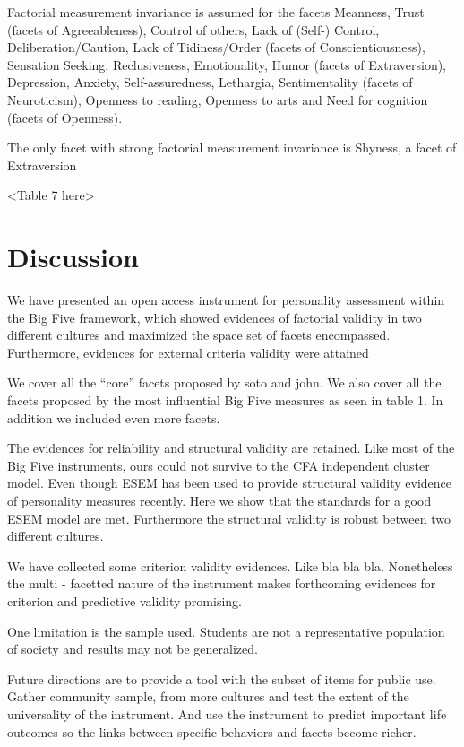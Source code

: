 \documentclass[man]{apa6}
\theoremstyle{definition}
\theoremstyle{definition}
\theoremstyle{definition}
\theoremstyle{remark}
\begin{document}
Factorial measurement invariance is assumed for the facets Meanness,
Trust (facets of Agreeableness), Control of others, Lack of (Self-)
Control, Deliberation/Caution, Lack of Tidiness/Order (facets of
Conscientiousness), Sensation Seeking, Reclusiveness, Emotionality,
Humor (facets of Extraversion), Depression, Anxiety, Self-assuredness,
Lethargia, Sentimentality (facets of Neuroticism), Openness to reading,
Openness to arts and Need for cognition (facets of Openness).

The only facet with strong factorial measurement invariance is Shyness,
a facet of Extraversion

\textless{}Table 7 here\textgreater{}

\hypertarget{discussion}{%
\section{Discussion}\label{discussion}}

We have presented an open access instrument for personality assessment
within the Big Five framework, which showed evidences of factorial
validity in two different cultures and maximized the space set of facets
encompassed. Furthermore, evidences for external criteria validity were
attained

We cover all the \enquote{core} facets proposed by soto and john. We
also cover all the facets proposed by the most influential Big Five
measures as seen in table 1. In addition we included even more facets.

The evidences for reliability and structural validity are retained. Like
most of the Big Five instruments, ours could not survive to the CFA
independent cluster model. Even though ESEM has been used to provide
structural validity evidence of personality measures recently. Here we
show that the standards for a good ESEM model are met. Furthermore the
structural validity is robust between two different cultures.

We have collected some criterion validity evidences. Like bla bla bla.
Nonetheless the multi - facetted nature of the instrument makes
forthcoming evidences for criterion and predictive validity promising.

One limitation is the sample used. Students are not a representative
population of society and results may not be generalized.

Future directions are to provide a tool with the subset of items for
public use. Gather community sample, from more cultures and test the
extent of the universality of the instrument. And use the instrument to
predict important life outcomes so the links between specific behaviors
and facets become richer.
\end{document}
